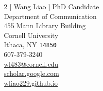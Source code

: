 \documentclass[11pt, letterpaper]{article} %
\begin{document}


\begin{multicols}{2}
[
{\LARGE Wang Liao} %
]
PhD Candidate\\
Department of Communication\\
455 Mann Library Building\\ %
Cornell University\\
Ithaca, NY \texttt{14850}\\

\columnbreak
{\tiny {}} 607-379-3240\\ %
{\tiny {}} \href{mailto:wl483@cornell.edu}{wl483@cornell.edu}\\ %
{\tiny {}} \href{https://scholar.google.com/citations?user=dH4uqKsAAAAJ}{scholar.google.com}\\
{\tiny {}} \href{https://wliao229.github.io}{wliao229.github.io}\\ %

\end{multicols}





\end{document}
